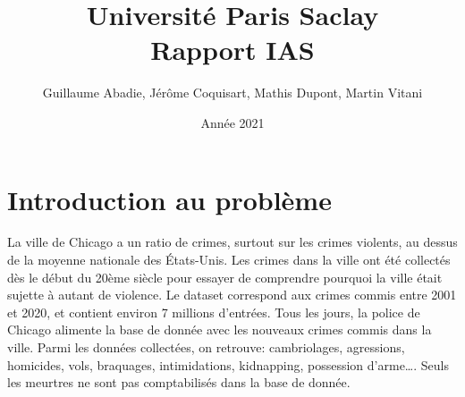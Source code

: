 \documentclass{article}
\title{\textbf{\Huge  Université Paris Saclay}\\ Rapport IAS}
\author{Guillaume Abadie, Jérôme Coquisart, Mathis Dupont, Martin Vitani}
\date{Année 2021}
\begin{document}
    \maketitle
    \tableofcontents

    \section{Introduction au problème}
    La ville de Chicago a un ratio de crimes, surtout sur les crimes violents,
    au dessus de la moyenne nationale des États-Unis.
    Les crimes dans la ville ont été collectés dès le début du 20ème siècle pour
    essayer de comprendre pourquoi la ville était sujette à autant de violence.
    Le dataset correspond aux crimes commis entre 2001 et 2020, et contient environ 
    7 millions d'entrées.
    Tous les jours, la police de Chicago alimente la base de donnée avec les
    nouveaux crimes commis dans la ville. 
    Parmi les données collectées, on retrouve: 
    cambriolages, agressions, homicides, vols, braquages, intimidations, kidnapping, 
    possession d'arme\dots.
    Seuls les meurtres ne sont pas comptabilisés dans la base de donnée.
\end{document}
